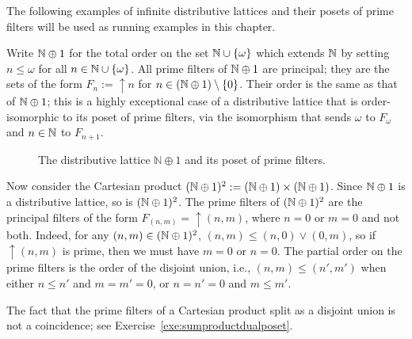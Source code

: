 The following examples of infinite distributive lattices and their posets of prime filters will be used as running examples in this chapter.
\begin{example}\label{exa:Nplus1squared}
  Write $\mathbb{N} \oplus 1$ for the total order on the set $\mathbb{N} \cup \{\omega\}$ which extends $\mathbb{N}$ by setting $n \leq \omega$ for all $n \in \mathbb{N} \cup \{\omega\}$. All prime filters of $\mathbb{N} \oplus 1$ are principal; they are the sets of the form $F_n := {\uparrow} n$ for $n \in (\mathbb{N} \oplus 1) \setminus \{0\}$. Their order is the same as that of $\mathbb{N} \oplus 1$; this is a highly exceptional case of a distributive lattice that is order-isomorphic to its poset of prime filters, via the isomorphism that sends $\omega$ to $F_\omega$ and $n \in \mathbb{N}$ to $F_{n+1}$. %

\begin{figure}[htp]
  \begin{center}
\end{center}
  \caption{The distributive lattice $\mathbb{N} \oplus 1$ and its poset of prime filters.}
  \label{fig:nplusone}
  \end{figure}

 Now consider the Cartesian product $(\mathbb{N} \oplus 1)^2 := (\mathbb{N} \oplus 1) \times (\mathbb{N} \oplus 1)$. Since $\mathbb{N} \oplus 1$ is a distributive lattice, so is $(\mathbb{N} \oplus 1)^2$. The prime filters of $(\mathbb{N} \oplus 1)^2$ are the principal filters of the form $F_{(n,m)} = {\uparrow} (n, m)$, where $n = 0$ or $m = 0$ and not both. Indeed, for any $(n,m) \in (\mathbb{N} \oplus 1)^2$, $(n,m) \leq (n,0) \vee (0,m)$, so if ${\uparrow} (n,m)$ is prime, then we must have $m = 0$ or $n = 0$. The partial order on the prime filters is the order of the disjoint union, i.e., $(n,m) \leq (n',m')$ when either $n \leq n'$ and $m = m' = 0$, or $n = n' = 0$ and $m \leq m'$.
  \end{example}
  The fact that the prime filters of a Cartesian product split as a disjoint union is not a coincidence; see Exercise~\ref{exe:sumproductdualposet}.


